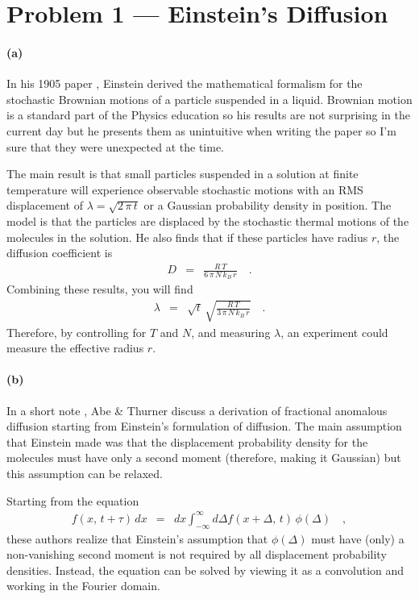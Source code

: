 \documentclass[12pt]{article}
\begin{document}
\section{Problem 1 --- Einstein's Diffusion}

\paragraph{(a)}

In his 1905 paper \cite{einstein}, Einstein derived the mathematical
formalism for the stochastic Brownian motions of a particle suspended in a
liquid.
Brownian motion is a standard part of the Physics education so his results are
not surprising in the current day but he presents them as unintuitive when
writing the paper so I'm sure that they were unexpected at the time.

The main result is that small particles suspended in a solution at finite
temperature will experience observable stochastic motions with an RMS
displacement of $\lambda = \sqrt{2\,\pi\,t}$ or a Gaussian probability
density in position.
The model is that the particles are displaced by the stochastic thermal
motions of the molecules in the solution.
He also finds that if these particles have radius $r$, the diffusion
coefficient is
\begin{eqnarray}
D &=& \frac{R\,T}{6\,\pi\,N\,k_B\,r} \quad.
\end{eqnarray}
Combining these results, you will find
\begin{eqnarray}
\lambda &=& \sqrt{t}\,\sqrt{\frac{R\,T}{3\,\pi\,N\,k_B\,r}} \quad.
\end{eqnarray}
Therefore, by controlling for $T$ and $N$, and measuring $\lambda$, an
experiment could measure the effective radius $r$.


\paragraph{(b)}

In a short note \cite{abe}, Abe \& Thurner discuss a derivation of fractional
anomalous diffusion starting from Einstein's formulation of diffusion.
The main assumption that Einstein made was that the displacement probability
density for the molecules must have only a second moment (therefore, making it
Gaussian) but this assumption can be relaxed.

Starting from the equation
\begin{eqnarray}
f(x,\,t + \tau) \, dx &=&  dx \int_{-\infty} ^\infty d\Delta
f(x+\Delta,\,t)\,\phi(\Delta) \quad,
\end{eqnarray}
these authors realize that Einstein's assumption that $\phi (\Delta)$ must
have (only) a non-vanishing second moment is not required by all displacement
probability densities.
Instead, the equation can be solved by viewing it as a convolution and working
in the Fourier domain.
\end{document}
